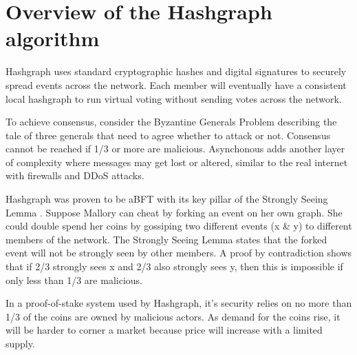 \section{Overview of the Hashgraph algorithm}


Hashgraph uses standard cryptographic hashes and digital signatures to securely spread events across the network. Each member will eventually have a consistent local hashgraph to run virtual voting without sending votes across the network.

To achieve consensus, consider the Byzantine Generals Problem \cite{shostak1982byzantine} describing the tale of three generals that need to agree whether to attack or not. Consensus cannot be reached if 1/3 or more are malicious. Asynchonous adds another layer of complexity where messages may get lost or altered, similar to the real internet with firewalls and DDoS attacks.

Hashgraph was proven to be aBFT with its key pillar of the Strongly Seeing Lemma \cite{baird2016}. Suppose Mallory can cheat by forking an event on her own graph. She could double spend her coins by gossiping two different events (x \& y) to different members of the network. The Strongly Seeing Lemma states that the forked event will not be strongly seen by other members. A proof by contradiction shows that if 2/3 strongly sees x and 2/3 also strongly sees y, then this is impossible if only less than 1/3 are malicious.

In a proof-of-stake system used by Hashgraph, it's security relies on no more than 1/3 of the coins are owned by malicious actors. As demand for the coins rise, it will be harder to corner a market because price will increase with a limited supply.

